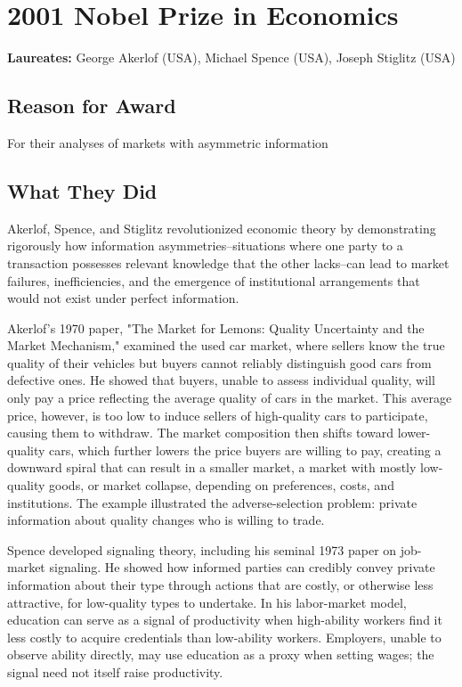 \chapter{2001 Nobel Prize in Economics}
\textbf{Laureates: }George Akerlof (USA), Michael Spence (USA), Joseph Stiglitz (USA)

\section*{Reason for Award}
For their analyses of markets with asymmetric information

\section{What They Did}
Akerlof, Spence, and Stiglitz revolutionized economic theory by demonstrating
rigorously how information asymmetries--situations where one party to a
transaction possesses relevant knowledge that the other lacks--can lead to
market failures, inefficiencies, and the emergence of institutional
arrangements that would not exist under perfect information.

Akerlof's 1970 paper, "The Market for Lemons: Quality Uncertainty and the
Market Mechanism," examined the used car market, where sellers know the true
quality of their vehicles but buyers cannot reliably distinguish good cars
from defective ones. He showed that buyers, unable to assess individual
quality, will only pay a price reflecting the average quality of cars in the
market. This average price, however, is too low to induce sellers of
high-quality cars to participate, causing them to withdraw. The market
composition then shifts toward lower-quality cars, which further lowers the
price buyers are willing to pay, creating a downward spiral that can result in
a smaller market, a market with mostly low-quality goods, or market collapse,
depending on preferences, costs, and institutions.
The example illustrated the adverse-selection problem: private information about
quality changes who is willing to trade.

Spence developed signaling theory, including his seminal 1973 paper on job-market
signaling. He showed how informed parties can credibly convey private information
about their type through actions that are costly, or otherwise less attractive,
for low-quality types to undertake. In his labor-market model, education can
serve as a signal of productivity when high-ability workers find it less costly
to acquire credentials than low-ability workers. Employers, unable to observe
ability directly, may use education as a proxy when setting wages; the signal need
not itself raise productivity.

